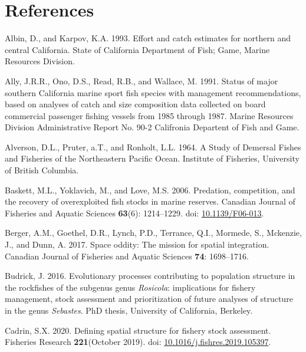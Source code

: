 \documentclass[
  english,
  a4paper,
]{article}
\newlength{\cslhangindent}
\newlength{\cslentryspacingunit} %
\newenvironment{CSLReferences}[2] %
 {%
  \setlength{\parindent}{0pt}
  \ifodd #1
  \let\oldpar\par
  \def\par{\hangindent=\cslhangindent\oldpar}
  \fi
  \setlength{\parskip}{#2\cslentryspacingunit}
 }%
 {}
\begin{document}
\clearpage

\hypertarget{references}{%
\section{References}\label{references}}

\hypertarget{refs}{}
\begin{CSLReferences}{1}{0}
\leavevmode{}%
Albin, D., and Karpov, K.A. 1993. {Effort and catch estimates for northern and central California}. State of California Department of Fish; Game, Marine Resources Division.

\leavevmode{}%
Ally, J.R.R., Ono, D.S., Read, R.B., and Wallace, M. 1991. {Status of major southern California marine sport fish species with management recommendations, based on analyses of catch and size composition data collected on board commercial passenger fishing vessels from 1985 through 1987}. Marine Resources Division Administrative Report No. 90-2 Califronia Departent of Fish and Game.

\leavevmode{}%
Alverson, D.L., Pruter, a.T., and Ronholt, L.L. 1964. {A Study of Demersal Fishes and Fisheries of the Northeastern Pacific Ocean}. Institute of Fisheries, University of British Columbia.

\leavevmode{}%
Baskett, M.L., Yoklavich, M., and Love, M.S. 2006. {Predation, competition, and the recovery of overexploited fish stocks in marine reserves}. Canadian Journal of Fisheries and Aquatic Sciences \textbf{63}(6): 1214--1229. doi: \href{https://doi.org/10.1139/F06-013}{10.1139/F06-013}.

\leavevmode{}%
Berger, A.M., Goethel, D.R., Lynch, P.D., Terrance, Q.I., Mormede, S., Mckenzie, J., and Dunn, A. 2017. {Space oddity: The mission for spatial integration}. Canadian Journal of Fisheries and Aquatic Sciences \textbf{74}: 1698--1716.

\leavevmode{}%
Budrick, J. 2016. {Evolutionary processes contributing to population structure in the rockfishes of the subgenus genus \emph{Rosicola}: implications for fishery management, stock assessment and prioritization of future analyses of structure in the genus \emph{Sebastes}.} PhD thesis, University of California, Berkeley.

\leavevmode{}%
Cadrin, S.X. 2020. {Defining spatial structure for fishery stock assessment}. Fisheries Research \textbf{221}(October 2019). doi: \href{https://doi.org/10.1016/j.fishres.2019.105397}{10.1016/j.fishres.2019.105397}.


\end{CSLReferences}
\end{document}
